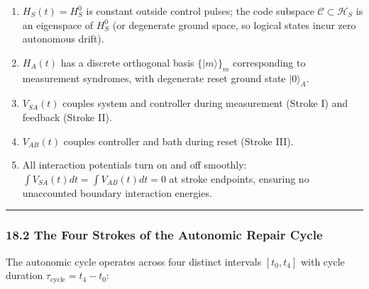 \documentclass[
]{article}
\providecommand{\tightlist}{%
  \setlength{\itemsep}{0pt}\setlength{\parskip}{0pt}}
\begin{document}
\begin{enumerate}
\def\labelenumi{\arabic{enumi}.}
\tightlist
\item
  \(H_S(t) = H_S^0\) is constant outside control pulses; the code
  subspace \(\mathcal{C} \subset \mathcal{H}_S\) is an eigenspace of
  \(H_S^0\) (or degenerate ground space, so logical states incur zero
  autonomous drift).
\item
  \(H_A(t)\) has a discrete orthogonal basis \(\{|m\rangle\}_m\)
  corresponding to measurement syndromes, with degenerate reset ground
  state \(|0\rangle_A\).
\item
  \(V_{SA}(t)\) couples system and controller during measurement (Stroke
  I) and feedback (Stroke II).
\item
  \(V_{AB}(t)\) couples controller and bath during reset (Stroke III).
\item
  All interaction potentials turn on and off smoothly:
  \(\int V_{SA}(t) dt = \int V_{AB}(t) dt = 0\) at stroke endpoints,
  ensuring no unaccounted boundary interaction energies.
\end{enumerate}

\begin{center}\rule{0.5\linewidth}{0.5pt}\end{center}

\subsubsection{18.2 The Four Strokes of the Autonomic Repair
Cycle}\label{the-four-strokes-of-the-autonomic-repair-cycle}

The autonomic cycle operates across four distinct intervals
\([t_0, t_4]\) with cycle duration
\(\tau_{\mathrm{cycle}} = t_4 - t_0\):
\end{document}
